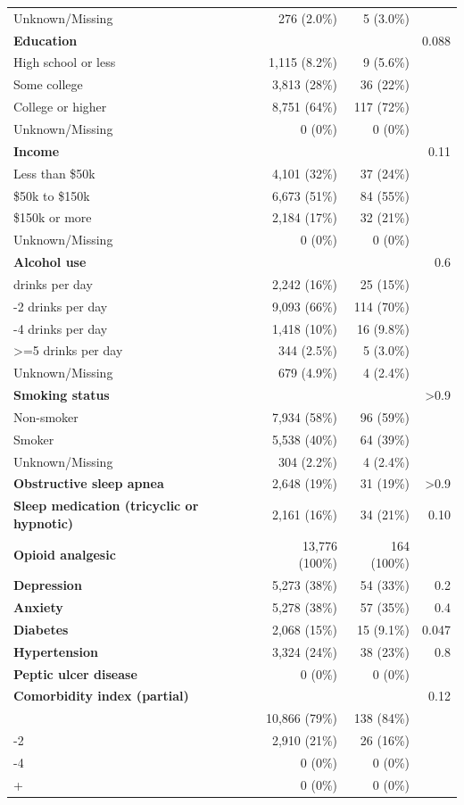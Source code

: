 \documentclass[11pt]{article}
\begin{document}
\begin{longtable}{@{}p{6.4cm}rrr@{}}
\quad Unknown/Missing & 276 (2.0\%) & 5 (3.0\%) &  \\
\textbf{Education} &  &  & 0.088 \\
\quad High school or less & 1,115 (8.2\%) & 9 (5.6\%) &  \\
\quad Some college & 3,813 (28\%) & 36 (22\%) &  \\
\quad College or higher & 8,751 (64\%) & 117 (72\%) &  \\
\quad Unknown/Missing & 0 (0\%) & 0 (0\%) &  \\
\textbf{Income} &  &  & 0.11 \\
\quad Less than \$50k & 4,101 (32\%) & 37 (24\%) &  \\
\quad \$50k to \$150k & 6,673 (51\%) & 84 (55\%) &  \\
\quad \$150k or more & 2,184 (17\%) & 32 (21\%) &  \\
\quad Unknown/Missing & 0 (0\%) & 0 (0\%) &  \\
\textbf{Alcohol use} &  &  & 0.6 \\
\quad 0 drinks per day & 2,242 (16\%) & 25 (15\%) &  \\
\quad 1-2 drinks per day & 9,093 (66\%) & 114 (70\%) &  \\
\quad 3-4 drinks per day & 1,418 (10\%) & 16 (9.8\%) &  \\
\quad >=5 drinks per day & 344 (2.5\%) & 5 (3.0\%) &  \\
\quad Unknown/Missing & 679 (4.9\%) & 4 (2.4\%) &  \\
\textbf{Smoking status} &  &  & >0.9 \\
\quad Non-smoker & 7,934 (58\%) & 96 (59\%) &  \\
\quad Smoker & 5,538 (40\%) & 64 (39\%) &  \\
\quad Unknown/Missing & 304 (2.2\%) & 4 (2.4\%) &  \\
\textbf{Obstructive sleep apnea} & 2,648 (19\%) & 31 (19\%) & >0.9 \\
\textbf{Sleep medication (tricyclic or hypnotic)} & 2,161 (16\%) & 34 (21\%) & 0.10 \\
\textbf{Opioid analgesic} & 13,776 (100\%) & 164 (100\%) &  \\
\textbf{Depression} & 5,273 (38\%) & 54 (33\%) & 0.2 \\
\textbf{Anxiety} & 5,278 (38\%) & 57 (35\%) & 0.4 \\
\textbf{Diabetes} & 2,068 (15\%) & 15 (9.1\%) & 0.047 \\
\textbf{Hypertension} & 3,324 (24\%) & 38 (23\%) & 0.8 \\
\textbf{Peptic ulcer disease} & 0 (0\%) & 0 (0\%) &  \\
\textbf{Comorbidity index (partial)} &  &  & 0.12 \\
\quad 0 & 10,866 (79\%) & 138 (84\%) &  \\
\quad 1-2 & 2,910 (21\%) & 26 (16\%) &  \\
\quad 3-4 & 0 (0\%) & 0 (0\%) &  \\
\quad 5+ & 0 (0\%) & 0 (0\%) &  \\
\bottomrule \end{longtable}\normalsize
\end{document}
